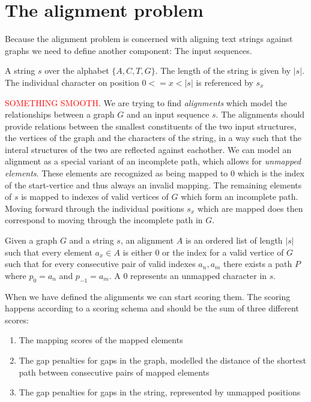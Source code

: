 \documentclass[thesis.tex]{subfiles}
\begin{document}
\section{The alignment problem}
{\parindent0pt
Because the alignment problem is concerned with aligning text strings against graphs we need to define another component: The input sequences.
\begin{defn}
  A string $s$ over the alphabet $\{A, C, T, G\}$. The length of the string is given by $|s|$. The individual character on position $0<=x<|s|$ is referenced by $s_x$
\end{defn}
\textcolor{red}{SOMETHING SMOOTH}. We are trying to find \textit{alignments} which model the relationships between a graph $G$ and an input sequence $s$. The alignments should provide relations between the smallest constituents of the two input structures, the vertices of the graph and the characters of the string, in a way such that the interal structures of the two are reflected against eachother. We can model an alignment as a special variant of an incomplete path, which allows for \textit{unmapped elements}. These elements are recognized as being mapped to $0$ which is the index of the start-vertice and thus always an invalid mapping. The remaining elements of $s$ is mapped to indexes of valid vertices of $G$ which form an incomplete path. Moving forward through the individual positions $s_x$ which are mapped does then correspond to moving through the incomplete path in $G$.
\begin{defn}[Alignment]
  Given a graph $G$ and a string $s$, an alignment $A$ is an ordered list of length $|s|$ such that every element $a_x \in A$ is either $0$ or the index for a valid vertice of $G$ such that for every consecutive pair of valid indexes $a_n, a_m$ there exists a path $P$ where $p_0=a_n$ and $p_{-1}=a_m$. A $0$ represents an unmapped character in $s$.
\end{defn}
When we have defined the alignments we can start scoring them. The scoring happens according to a scoring schema and should be the sum of three different scores:
\begin{enumerate}
  \item The mapping scores of the mapped elements
  \item The gap penalties for gaps in the graph, modelled the distance of the shortest path between consecutive pairs of mapped elements
  \item The gap penalties for gaps in the string, represented by unmapped positions

\end{enumerate}}
\end{document}
